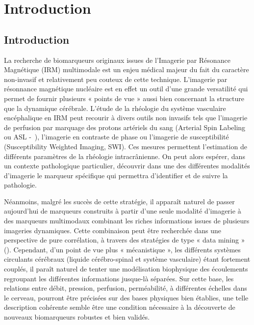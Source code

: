 \chapter{Introduction}
	
\minitoc
	





\section{Introduction}
		
		La recherche de biomarqueurs originaux issues de l’Imagerie par Résonance Magnétique (IRM) multimodale est un enjeu médical majeur du fait du caractère non-invasif et relativement peu 
couteux de cette technique. L'imagerie par résonnance magnétique nucléaire est en effet un outil d'une grande versatilité qui permet de fournir plusieurs « points de vue » aussi bien concernant 
la structure que la dynamique cérébrale. L’étude de la rhéologie du système vasculaire encéphalique en IRM peut recourir à divers outils non invasifs tels que l’imagerie de perfusion par marquage 
des protons artériels du sang (Arterial Spin Labeling ou ASL -~\cite{Alsop2014}), l’imagerie en contraste de phase ou l’imagerie de susceptibilité (Susceptibility Weighted Imaging, SWI). Ces mesures permettent 
l’estimation de différents paramètres de la rhéologie intracrânienne. On peut alors espérer, dans un contexte pathologique particulier, découvrir dans une des différentes modalités d'imagerie le 
marqueur spécifique qui permettra d'identifier et de suivre la pathologie.

Néanmoins, malgré les succès de cette stratégie, il apparaît naturel de passer aujourd'hui de marqueurs construits à partir d'une seule modalité d'imagerie à des marqueurs multimodaux combinant 
les riches informations issues de plusieurs imageries dynamiques. Cette combinaison peut être recherchée dans une perspective de pure corrélation, à travers des stratégies de type « data mining » (\cite{Lin2012}). 
Cependant, d'un point de vue plus « mécanistique », les différents systèmes circulants cérébraux (liquide cérébro-spinal et système vasculaire) étant fortement couplés, il paraît naturel de tenter une 
modélisation biophysique des écoulements regroupant les différentes informations jusque-là séparées. Sur cette base, les relations entre débit, pression, perfusion, perméabilité, à différentes échelles 
dans le cerveau, pourront être précisées sur des bases physiques bien établies, une telle description cohérente semble être une condition nécessaire à la découverte de nouveaux biomarqueurs robustes et 
bien validés.

